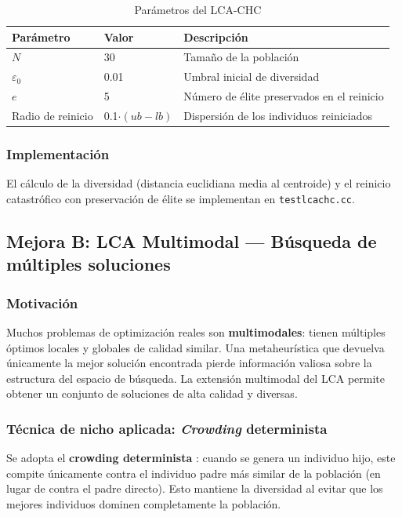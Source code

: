 \begin{table}[h!]
\centering
\caption{Parámetros del LCA-CHC}
\label{tab:params_chc}
\renewcommand{\arraystretch}{1.3}
\begin{tabular}{@{}lll@{}}
\toprule
\textbf{Parámetro} & \textbf{Valor} & \textbf{Descripción} \\
\midrule
$N$ & 30 & Tamaño de la población \\
$\varepsilon_0$ & 0.01 & Umbral inicial de diversidad \\
$e$ & 5  & Número de élite preservados en el reinicio \\
Radio de reinicio & 0.1$\cdot(ub-lb)$ & Dispersión de los individuos reiniciados \\
\bottomrule
\end{tabular}
\end{table}

\subsubsection{Implementación}

El c\'alculo de la diversidad (distancia euclidiana media al centroide) y el reinicio catastr\'ofico con preservaci\'on de \'elite se implementan en \texttt{testlcachc.cc}.

\subsection{Mejora B: LCA Multimodal — Búsqueda de múltiples soluciones}

\subsubsection{Motivación}

Muchos problemas de optimización reales son \textbf{multimodales}: tienen múltiples
óptimos locales y globales de calidad similar. Una metaheurística que devuelva
únicamente la mejor solución encontrada pierde información valiosa sobre la estructura
del espacio de búsqueda. La extensión multimodal del LCA permite obtener un conjunto
de soluciones de alta calidad y diversas.

\subsubsection{Técnica de nicho aplicada: \emph{Crowding} determinista}

Se adopta el \textbf{crowding determinista} \cite{mahfoud1995niching}: cuando se genera
un individuo hijo, este compite únicamente contra el individuo padre más similar de la
población (en lugar de contra el padre directo). Esto mantiene la diversidad al evitar
que los mejores individuos dominen completamente la población.

